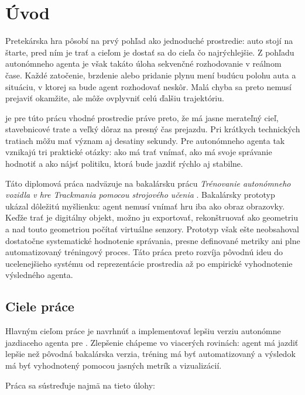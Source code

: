 \chapter*{Úvod}

Pretekárska hra pôsobí na prvý pohľad ako jednoduché prostredie: auto stojí na štarte, pred ním je trať a cieľom je dostať sa do cieľa čo najrýchlejšie. Z pohľadu autonómneho agenta je však takáto úloha sekvenčné rozhodovanie v reálnom čase. Každé zatočenie, brzdenie alebo pridanie plynu mení budúcu polohu auta a situáciu, v ktorej sa bude agent rozhodovať neskôr. Malá chyba sa preto nemusí prejaviť okamžite, ale môže ovplyvniť celú ďalšiu trajektóriu.

\Trackmania{} je pre túto prácu vhodné prostredie práve preto, že má jasne merateľný cieľ, stavebnicové trate a veľký dôraz na presný čas prejazdu. Pri krátkych technických tratiach môžu mať význam aj desatiny sekundy. Pre autonómneho agenta tak vznikajú tri praktické otázky: ako má trať vnímať, ako má svoje správanie hodnotiť a ako nájsť politiku, ktorá bude jazdiť rýchlo aj stabilne.

Táto diplomová práca nadväzuje na bakalársku prácu \emph{Trénovanie autonómneho vozidla v hre Trackmania pomocou strojového učenia} \cite{melkovic2024bachelor}. Bakalársky prototyp ukázal dôležitú myšlienku: agent nemusí vnímať hru iba ako obraz obrazovky. Keďže trať je digitálny objekt, možno ju exportovať, rekonštruovať ako geometriu a nad touto geometriou počítať virtuálne senzory. Prototyp však ešte neobsahoval dostatočne systematické hodnotenie správania, presne definované metriky ani plne automatizovaný tréningový proces. Táto práca preto rozvíja pôvodnú ideu do ucelenejšieho systému od reprezentácie prostredia až po empirické vyhodnotenie výsledného agenta.

\section*{Ciele práce}

Hlavným cieľom práce je navrhnúť a implementovať lepšiu verziu autonómne jazdiaceho agenta pre \Trackmania{}. Zlepšenie chápeme vo viacerých rovinách: agent má jazdiť lepšie než pôvodná bakalárska verzia, tréning má byť automatizovaný a výsledok má byť vyhodnotený pomocou jasných metrík a vizualizácií.

Práca sa sústreďuje najmä na tieto úlohy:

